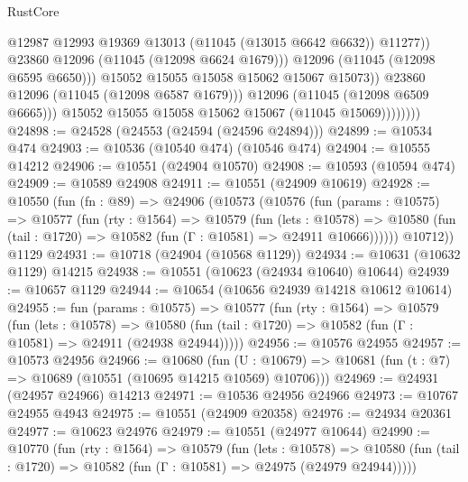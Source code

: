\begin{lexlean}{RustCore}
\begin{coremodule}
                                  @12987
                                  @12993
                                  @19369
                                  @13013
                                  (@11045 (@13015 @6642 @6632))
                                  @11277))
                              @23860
                              @12096
                              (@11045 (@12098 @6624 @1679)))
                            @12096
                            (@11045 (@12098 @6595 @6650)))
                          @15052
                          @15055
                          @15058
                          @15062
                          @15067
                          @15073))
                      @23860
                      @12096
                      (@11045 (@12098 @6587 @1679)))
                    @12096
                    (@11045 (@12098 @6509 @6665)))
                  @15052
                  @15055
                  @15058
                  @15062
                  @15067
                  (@11045 @15069))))))))
@24898 := @24528 (@24553 (@24594 (@24596 @24894)))
@24899 := @10534 @474
@24903 := @10536 (@10540 @474) (@10546 @474)
@24904 := @10555 @14212
@24906 := @10551 (@24904 @10570)
@24908 := @10593 (@10594 @474)
@24909 := @10589 @24908
@24911 := @10551 (@24909 @10619)
@24928 := @10550
    (fun (fn : @89) =>
    @24906
      (@10573
        (@10576
          (fun (params : @10575) =>
          @10577
            (fun (rty : @1564) =>
            @10579
              (fun (lets : @10578) =>
              @10580 (fun (tail : @1720) => @10582 (fun (Γ : @10581) => @24911 @10666))))))
        @10712))
    @1129
@24931 := @10718 (@24904 (@10568 @1129))
@24934 := @10631 (@10632 @1129) @14215
@24938 := @10551 (@10623 (@24934 @10640) @10644)
@24939 := @10657 @1129
@24944 := @10654 (@10656 @24939 @14218 @10612 @10614)
@24955 := fun (params : @10575) =>
  @10577
    (fun (rty : @1564) =>
    @10579
      (fun (lets : @10578) =>
      @10580 (fun (tail : @1720) => @10582 (fun (Γ : @10581) => @24911 (@24938 @24944)))))
@24956 := @10576 @24955
@24957 := @10573 @24956
@24966 := @10680
    (fun (U : @10679) => @10681 (fun (t : @7) => @10689 (@10551 (@10695 @14215 @10569) @10706)))
@24969 := @24931 (@24957 @24966) @14213
@24971 := @10536 @24956 @24966
@24973 := @10767 @24955 @4943
@24975 := @10551 (@24909 @20358)
@24976 := @24934 @20361
@24977 := @10623 @24976
@24979 := @10551 (@24977 @10644)
@24990 := @10770
    (fun (rty : @1564) =>
    @10579
      (fun (lets : @10578) =>
      @10580 (fun (tail : @1720) => @10582 (fun (Γ : @10581) => @24975 (@24979 @24944)))))

\end{coremodule}
\end{lexlean}
